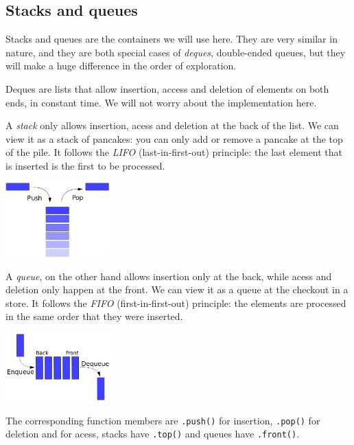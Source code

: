 \subsection{Stacks and queues}

Stacks and queues are the containers we will use here.
They are very similar in nature, and they are both special cases of
\emph{deques}, double-ended queues, but they will make a huge difference
in the order of exploration.

Deques are lists that allow insertion, access and deletion
of elements on both ends, in constant time.
We will not worry about the implementation here.

A \emph{stack} only allows insertion, acess and deletion
at the back of the list.
We can view it as a stack of pancakes: you can only add or remove a pancake
at the top of the pile.
It follows the \emph{LIFO} (last-in-first-out) principle:
the last element that is inserted is the first to be processed.
\begin{center}
    \includegraphics[width=0.3\textwidth]{img/stack}
\end{center}

A \emph{queue}, on the other hand allows insertion only at the back,
while acess and deletion only happen at the front.
We can view it as a queue at the checkout in a store.
It follows the \emph{FIFO} (first-in-first-out) principle:
the elements are processed in the same order that they were inserted.
\begin{center}
    \includegraphics[width=0.3\textwidth]{img/queue}
\end{center}

The corresponding function members are \texttt{.push()} for insertion,
\texttt{.pop()} for deletion and for acess, stacks have \texttt{.top()}
and queues have \texttt{.front()}.
